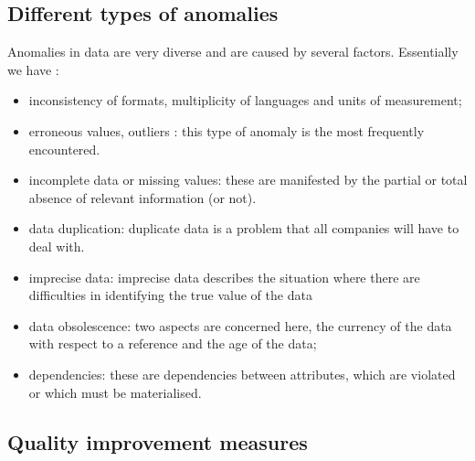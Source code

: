 \subsection{Different types of anomalies}
Anomalies in data are very diverse and are caused by several factors. Essentially we have :
\begin{itemize}[parsep=0cm,itemsep=0cm]
    \item inconsistency of formats, multiplicity of languages and units of measurement;
    \item erroneous values, outliers : this type of anomaly is the most frequently encountered. 
    \item incomplete data or missing values: these are manifested by the partial or total absence of relevant information (or not).
    \item data duplication: duplicate data is a problem that all companies will have to deal with.
    \item imprecise data: imprecise data describes the situation where there are difficulties in identifying the true value of the data
    \item data obsolescence: two aspects are concerned here, the currency of the data with respect to a reference and the age of the data;
    \item dependencies: these are dependencies between attributes, which are violated or which must be materialised.
\end{itemize}


\subsection{Quality improvement measures}

